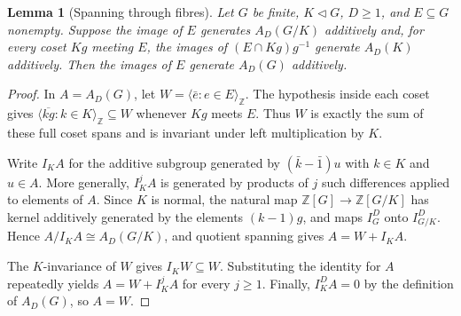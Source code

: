 \documentclass[11pt,a4paper,reqno]{amsart}
\newtheorem{lemma}[theorem]{Lemma}
\theoremstyle{definition}
\theoremstyle{remark}
\numberwithin{equation}{section}
\newcommand{\Z}{\mathbb Z}
\newcommand{\spanZ}[1]{\langle #1\rangle_{\Z}}
\begin{document}
\begin{lemma}[Spanning through fibres]\label{lem:fibre-spanning}
Let $G$ be finite, $K\lhd G$, $D\ge1$, and $E\subseteq G$ nonempty. Suppose the image of $E$ generates $A_D(G/K)$ additively and, for every coset $Kg$ meeting $E$, the images of $(E\cap Kg)g^{-1}$ generate $A_D(K)$ additively. Then the images of $E$ generate $A_D(G)$ additively.
\end{lemma}
\begin{proof}
In $A=A_D(G)$, let $W=\spanZ{\bar e:e\in E}$. The hypothesis inside each coset gives $\spanZ{\overline{kg}:k\in K}\subseteq W$ whenever $Kg$ meets $E$. Thus $W$ is exactly the sum of these full coset spans and is invariant under left multiplication by $K$.

Write $I_KA$ for the additive subgroup generated by $(\bar k-\bar1)u$ with $k\in K$ and $u\in A$. More generally, $I_K^jA$ is generated by products of $j$ such differences applied to elements of $A$. Since $K$ is normal, the natural map $\Z[G]\to\Z[G/K]$ has kernel additively generated by the elements $(k-1)g$, and maps $I_G^D$ onto $I_{G/K}^D$. Hence $A/I_KA\cong A_D(G/K)$, and quotient spanning gives $A=W+I_KA$.

The $K$-invariance of $W$ gives $I_KW\subseteq W$. Substituting the identity for $A$ repeatedly yields $A=W+I_K^jA$ for every $j\ge1$. Finally, $I_K^DA=0$ by the definition of $A_D(G)$, so $A=W$.
\end{proof}
\end{document}

